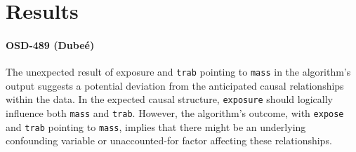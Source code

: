 \documentclass{article}
\begin{document}
\section{Results}

\paragraph{OSD-489 (Dubeé)}

The unexpected result of exposure and \texttt{trab} pointing to \texttt{mass} in the algorithm's output suggests a potential deviation from the anticipated causal relationships within the data. In the expected causal structure, \texttt{exposure} should logically influence both \texttt{mass} and \texttt{trab}. However, the algorithm's outcome, with \texttt{expose} and \texttt{trab} pointing to \texttt{mass}, implies that there might be an underlying confounding variable or unaccounted-for factor affecting these relationships.
\end{document}
